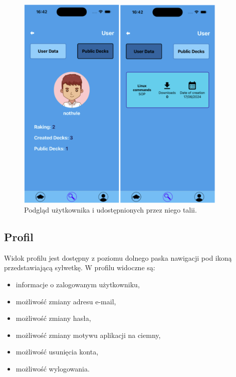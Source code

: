 \begin{figure}[H]
    \centering
    \includegraphics[width=0.9\textwidth]{chapters/chapter_10/images_mobile/mobile_other_user}
    \caption{Podgląd użytkownika i udostępnionych przez niego talii.}
    \label{img:mobile_other_user}
\end{figure}


\subsection{Profil}
Widok profilu jest dostępny z poziomu dolnego paska nawigacji pod ikoną przedstawiającą sylwetkę. W profilu widoczne są:
\begin{itemize}
    \item informacje o zalogowanym użytkowniku,
    \item możliwość zmiany adresu e-mail,
    \item możliwość zmiany hasła,
    \item możliwość zmiany motywu aplikacji na ciemny,
    \item możliwość usunięcia konta,
    \item możliwość wylogowania.
\end{itemize}



